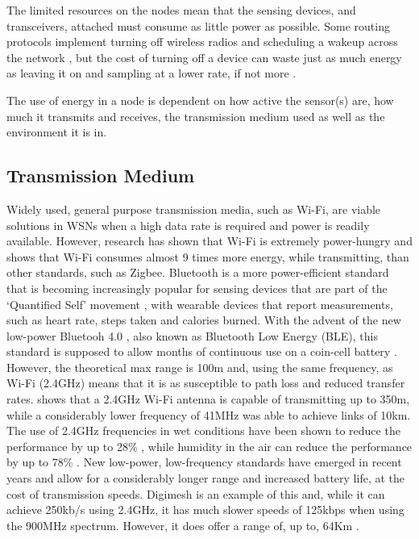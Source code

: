 	The limited resources on the nodes mean that the sensing devices, and transceivers, attached must consume as little power as possible. Some routing protocols implement turning off wireless radios and scheduling a wakeup across the network \cite{Vaidya2004}, but the cost of turning off a device can waste just as much energy as leaving it on and sampling at a lower rate, if not more \cite{Estrin2001}.

	The use of energy in a node is dependent on how active the sensor(s) are, how much it transmits and receives, the transmission medium used as well as the environment it is in.

\subsection{Transmission Medium}\label{bg:trans}
	Widely used, general purpose transmission media, such as Wi-Fi, are viable solutions in WSNs when a high data rate is required and power is readily available. However, research has shown that Wi-Fi is extremely power-hungry and \cite{Lee2007} shows that Wi-Fi consumes almost 9 times more energy, while transmitting, than other standards, such as Zigbee.
	Bluetooth is a more power-efficient standard that is becoming increasingly popular for sensing devices that are part of the `Quantified Self' movement \cite{Swan2012}, with wearable devices that report measurements, such as heart rate, steps taken and calories burned. With the advent of the new low-power Bluetooh 4.0 , also known as Bluetooth Low Energy (BLE), this standard is supposed to allow months of continuous use on a coin-cell battery \cite{gomez2012overview}. However, the theoretical max range is 100m and, using the same frequency, as Wi-Fi (2.4GHz) means that it is as susceptible to path loss and reduced transfer rates.
	\cite{Zennaro} shows that a 2.4GHz Wi-Fi antenna is capable of transmitting up to 350m, while a considerably lower frequency of 41MHz was able to achieve links of 10km. The use of 2.4GHz frequencies in wet conditions have been shown to reduce the performance by up to 28\% \cite{Markham2010}, while humidity in the air can reduce the performance by up to 78\% \cite{Figueiredo2009}.
	New low-power, low-frequency standards have emerged in recent years and allow for a considerably longer range and increased battery life, at the cost of transmission speeds. Digimesh is an example of this and, while it can achieve 250kb/s using 2.4GHz, it has much slower speeds of 125kbps when using the 900MHz spectrum. However, it does offer a range of, up to, 64Km \cite{Bayat2012}.

